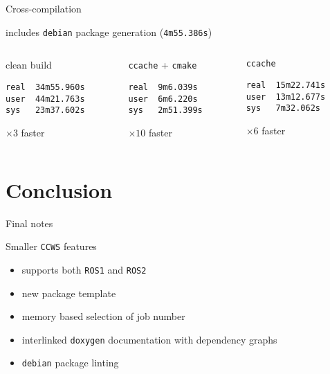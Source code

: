 \documentclass[hyperref={colorlinks=false, breaklinks=true},11pt]{beamer}
\begin{document}
\begin{frame}[fragile]{Cross-compilation}
    \begin{block}{includes \texttt{debian} package generation (\texttt{4m55.386s})}
        \vspace{3mm}
        \begin{columns}[T]
            \begin{column}{.3\textwidth}
                clean build
\begin{verbatim}
real  34m55.960s
user  44m21.763s
sys   23m37.602s
\end{verbatim}
$\times 3$ faster
            \end{column}
            \begin{column}{.3\textwidth}
                \texttt{ccache} + \texttt{cmake}
\begin{verbatim}
real  9m6.039s
user  6m6.220s
sys   2m51.399s
\end{verbatim}
$\times 10$ faster
            \end{column}
            \begin{column}{.3\textwidth}
                \texttt{ccache}
\begin{verbatim}
real  15m22.741s
user  13m12.677s
sys   7m32.062s
\end{verbatim}
$\times 6$ faster
            \end{column}
        \end{columns}
    \end{block}
\end{frame}


\section{Conclusion}

\begin{frame}{Final notes}
    \begin{block}{Smaller \texttt{CCWS} features}
        \begin{itemize}
            \item supports both \texttt{ROS1} and \texttt{ROS2}
            \item new package template
            \item memory based selection of job number
            \item interlinked \texttt{doxygen} documentation with dependency graphs
            \item \texttt{debian} package linting
        \end{itemize}
    \end{block}
\end{frame}
\end{document}

